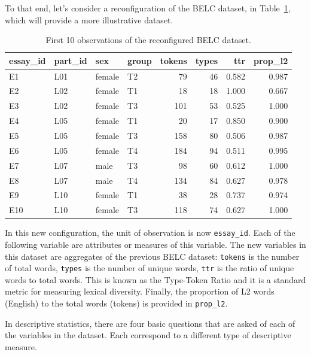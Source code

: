\documentclass[
  letterpaper,
  DIV=11,
  numbers=noendperiod]{scrreport}
\theoremstyle{definition}
\theoremstyle{remark}
\begin{document}
To that end, let's consider a reconfiguration of the BELC dataset, in
Table~\ref{tbl-aa-belc-reconfig}, which will provide a more illustrative
dataset.

\hypertarget{tbl-aa-belc-reconfig}{}
\begin{table}
\caption{\label{tbl-aa-belc-reconfig}First 10 observations of the reconfigured BELC dataset. }\tabularnewline

\centering
\begin{tabular}{l|l|l|l|r|r|r|r}
\hline
essay\_id & part\_id & sex & group & tokens & types & ttr & prop\_l2\\
\hline
E1 & L01 & female & T2 & 79 & 46 & 0.582 & 0.987\\
\hline
E2 & L02 & female & T1 & 18 & 18 & 1.000 & 0.667\\
\hline
E3 & L02 & female & T3 & 101 & 53 & 0.525 & 1.000\\
\hline
E4 & L05 & female & T1 & 20 & 17 & 0.850 & 0.900\\
\hline
E5 & L05 & female & T3 & 158 & 80 & 0.506 & 0.987\\
\hline
E6 & L05 & female & T4 & 184 & 94 & 0.511 & 0.995\\
\hline
E7 & L07 & male & T3 & 98 & 60 & 0.612 & 1.000\\
\hline
E8 & L07 & male & T4 & 134 & 84 & 0.627 & 0.978\\
\hline
E9 & L10 & female & T1 & 38 & 28 & 0.737 & 0.974\\
\hline
E10 & L10 & female & T3 & 118 & 74 & 0.627 & 1.000\\
\hline
\end{tabular}
\end{table}

In this new configuration, the unit of observation is now
\texttt{essay\_id}. Each of the following variable are attributes or
measures of this variable. The new variables in this dataset are
aggregates of the previous BELC dataset: \texttt{tokens} is the number
of total words, \texttt{types} is the number of unique words,
\texttt{ttr} is the ratio of unique words to total words. This is known
as the Type-Token Ratio and it is a standard metric for measuring
lexical diversity. Finally, the proportion of L2 words (English) to the
total words (tokens) is provided in \texttt{prop\_l2}.

In descriptive statistics, there are four basic questions that are asked
of each of the variables in the dataset. Each correspond to a different
type of descriptive measure.
\end{document}
